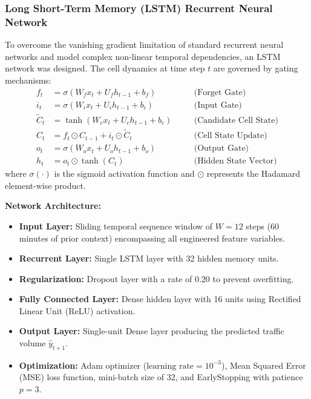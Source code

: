 \documentclass[12pt,a4paper]{article}
\begin{document}
\subsubsection{Long Short-Term Memory (LSTM) Recurrent Neural Network}
To overcome the vanishing gradient limitation of standard recurrent neural networks and model complex non-linear temporal dependencies, an LSTM network was designed. The cell dynamics at time step $t$ are governed by gating mechanisms:
\begin{align}
    f_t &= \sigma\left(W_f x_t + U_f h_{t-1} + b_f\right) \quad &&\text{(Forget Gate)} \\
    i_t &= \sigma\left(W_i x_t + U_i h_{t-1} + b_i\right) \quad &&\text{(Input Gate)} \\
    \tilde{C}_t &= \tanh\left(W_c x_t + U_c h_{t-1} + b_c\right) \quad &&\text{(Candidate Cell State)} \\
    C_t &= f_t \odot C_{t-1} + i_t \odot \tilde{C}_t \quad &&\text{(Cell State Update)} \\
    o_t &= \sigma\left(W_o x_t + U_o h_{t-1} + b_o\right) \quad &&\text{(Output Gate)} \\
    h_t &= o_t \odot \tanh(C_t) \quad &&\text{(Hidden State Vector)}
\end{align}
where $\sigma(\cdot)$ is the sigmoid activation function and $\odot$ represents the Hadamard element-wise product.

\textbf{Network Architecture:}
\begin{itemize}
    \item \textbf{Input Layer:} Sliding temporal sequence window of $W = 12$ steps (60 minutes of prior context) encompassing all engineered feature variables.
    \item \textbf{Recurrent Layer:} Single LSTM layer with 32 hidden memory units.
    \item \textbf{Regularization:} Dropout layer with a rate of $0.20$ to prevent overfitting.
    \item \textbf{Fully Connected Layer:} Dense hidden layer with 16 units using Rectified Linear Unit (ReLU) activation.
    \item \textbf{Output Layer:} Single-unit Dense layer producing the predicted traffic volume $\hat{y}_{t+1}$.
    \item \textbf{Optimization:} Adam optimizer ($\text{learning rate} = 10^{-3}$), Mean Squared Error (MSE) loss function, mini-batch size of 32, and EarlyStopping with patience $p=3$.
\end{itemize}
\end{document}
